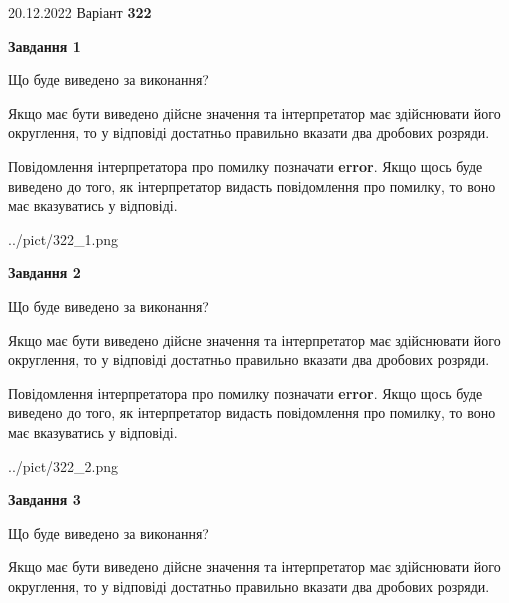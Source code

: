 \documentclass[12pt, ukrainian]{article}
\begin{document}
{20.12.2022 Варіант \No \textbf { 322 }\par}
{
\begin {Large}

{\begin {center}\textbf{Завдання 1}\end {center}}\par
Що буде виведено за виконання? \par

Якщо має бути виведено дійсне значення та інтерпретатор має здійснювати його округлення, 
то у відповіді достатньо правильно вказати два дробових розряди.

Повідомлення інтерпретатора про помилку позначати \textbf{error}.
Якщо щось буде виведено до того, як інтерпретатор видасть повідомлення про помилку, 
то воно має вказуватись у відповіді. \par

\begin{center}
	{../pict/322_1.png}
\end{center}
\newpage

{\begin {center}\textbf{Завдання 2}\end {center}}\par
Що буде виведено за виконання? \par

Якщо має бути виведено дійсне значення та інтерпретатор має здійснювати його округлення, 
то у відповіді достатньо правильно вказати два дробових розряди.

Повідомлення інтерпретатора про помилку позначати \textbf{error}.
Якщо щось буде виведено до того, як інтерпретатор видасть повідомлення про помилку, 
то воно має вказуватись у відповіді. \par

\begin{center}
	{../pict/322_2.png}
\end{center}
\newpage

{\begin {center}\textbf{Завдання 3}\end {center}}\par
Що буде виведено за виконання? \par

Якщо має бути виведено дійсне значення та інтерпретатор має здійснювати його округлення, 
то у відповіді достатньо правильно вказати два дробових розряди.


\end{Large}}
\end{document}
